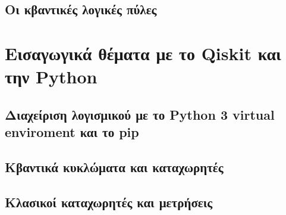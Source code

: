 \subsection{Οι κβαντικές λογικές πύλες}

\section{Εισαγωγικά θέματα με το Qiskit και την Python}
\subsection{Διαχείριση λογισμικού με το Python 3 virtual enviroment και το pip}
\subsection{Κβαντικά κυκλώματα και καταχωρητές}
\subsection{Κλασικοί καταχωρητές και μετρήσεις}
